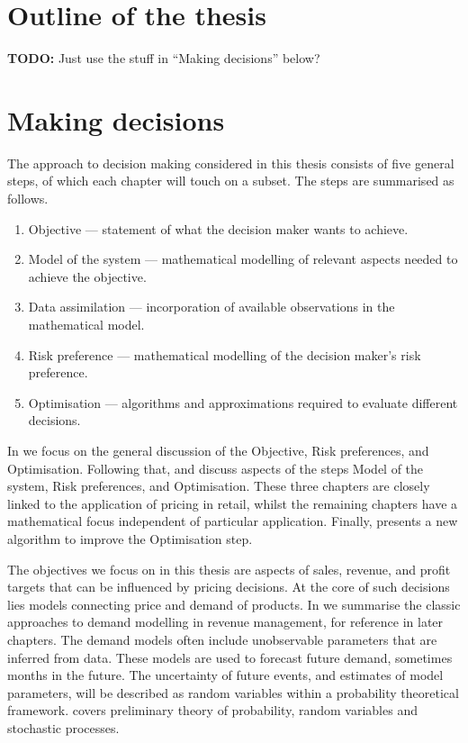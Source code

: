 \documentclass[main.tex]{subfiles}
\begin{document}
\section{Outline of the thesis}
\textbf{TODO:} Just use the stuff in ``Making decisions'' below?

\section{Making decisions}
The approach to decision making considered in this thesis consists of
five general steps, of which each chapter will touch on a subset.
The steps are summarised as follows.
\begin{enumerate}
\item Objective --- statement of what the decision maker wants to achieve.
\item Model of the system --- mathematical modelling of relevant aspects
  needed to achieve the objective.
\item Data assimilation --- incorporation of available observations in
  the mathematical model.
\item Risk preference --- mathematical modelling of the decision maker's risk
  preference.
\item Optimisation --- algorithms and approximations required to
  evaluate different decisions.
\end{enumerate}
In  we focus on the general discussion of the
Objective, Risk preferences, and Optimisation.
Following that,  and
 discuss  aspects of the steps Model of the system, Risk
preferences, and Optimisation.
These three chapters are closely linked to the application of pricing
in retail, whilst the remaining chapters have a mathematical focus
independent of particular application.
Finally,  presents a new
algorithm to improve the Optimisation step.

The objectives we focus on in this thesis are aspects
of sales, revenue, and profit targets that can be influenced by
pricing decisions.
At the core of such decisions lies models connecting price and demand of products.
In  we summarise the classic approaches
to demand modelling in revenue management, for reference in later
chapters.
The demand models often include unobservable parameters that are
inferred from data.
These models are used to forecast future demand, sometimes months in
the future.
The uncertainty of future events, and estimates of model
parameters, will be described as random variables within a probability
theoretical framework.  covers preliminary
theory of probability, random variables and stochastic
processes.
\end{document}
